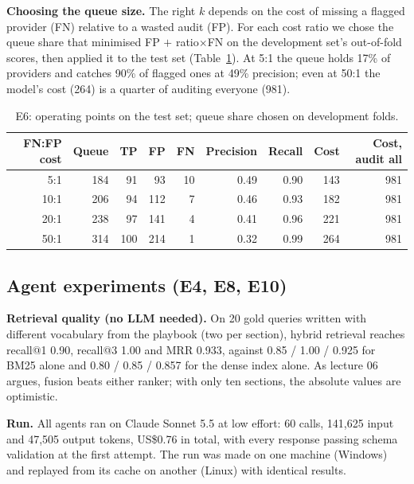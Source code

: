 \documentclass[11pt,a4paper]{article}
\begin{document}
\textbf{Choosing the queue size.} The right $k$ depends on the cost of missing a flagged provider (FN) relative to a wasted audit (FP). For each cost ratio we chose the queue share that minimised FP $+$ ratio$\times$FN on the development set's out-of-fold scores, then applied it to the test set (Table~\ref{tab:ops}). At 5:1 the queue holds 17\% of providers and catches 90\% of flagged ones at 49\% precision; even at 50:1 the model's cost (264) is a quarter of auditing everyone (981).

\begin{table}[H]\centering\small
\caption{E6: operating points on the test set; queue share chosen on development folds.}\label{tab:ops}
\begin{tabular}{rrrrrrrrr}
\toprule
FN:FP cost & Queue & TP & FP & FN & Precision & Recall & Cost & Cost, audit all \\
\midrule
5:1 & 184 & 91 & 93 & 10 & 0.49 & 0.90 & 143 & 981 \\
10:1 & 206 & 94 & 112 & 7 & 0.46 & 0.93 & 182 & 981 \\
20:1 & 238 & 97 & 141 & 4 & 0.41 & 0.96 & 221 & 981 \\
50:1 & 314 & 100 & 214 & 1 & 0.32 & 0.99 & 264 & 981 \\
\bottomrule
\end{tabular}
\end{table}

\subsection{Agent experiments (E4, E8, E10)}

\textbf{Retrieval quality (no LLM needed).} On 20 gold queries written with different vocabulary from the playbook (two per section), hybrid retrieval reaches recall@1 0.90, recall@3 1.00 and MRR 0.933, against 0.85 / 1.00 / 0.925 for BM25 alone and 0.80 / 0.85 / 0.857 for the dense index alone. As lecture 06 argues, fusion beats either ranker; with only ten sections, the absolute values are optimistic.

\textbf{Run.} All agents ran on Claude Sonnet 5.5 at low effort: 60 calls, 141,625 input and 47,505 output tokens, US\$0.76 in total, with every response passing schema validation at the first attempt. The run was made on one machine (Windows) and replayed from its cache on another (Linux) with identical results.
\end{document}
